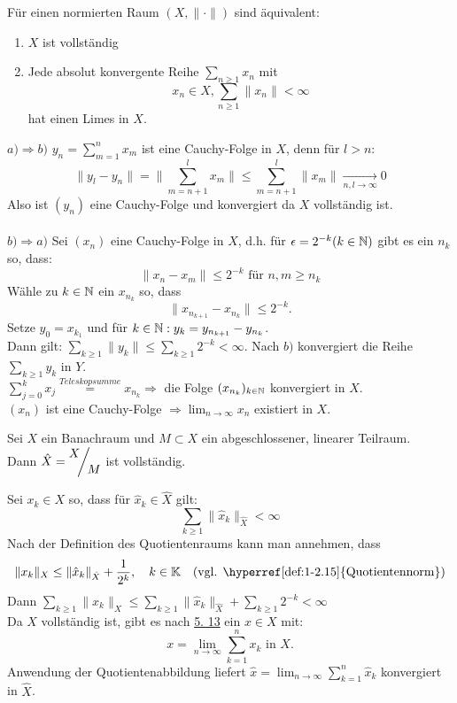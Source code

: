 \begin{lemma} \label{lemma:5.13}
	Für einen normierten Raum $(X, \| \cdot \|)$ sind äquivalent:
	\begin{enumerate}[label=\alph*\upshape)]
		\item $X$ ist vollständig
		\item Jede absolut konvergente Reihe $\sum_{n \geq 1} x_{n}$ mit
			\[ x_{n} \in X, \sum_{n \geq 1} \| x_{n} \| < \infty \]
			hat einen Limes in $X$.
	\end{enumerate}	
\end{lemma}

\begin{beweis}
	$a) \Rightarrow b)$	$y_{n} = \sum_{m = 1}^{n} x_{m}$ ist eine Cauchy-Folge in $X$, denn für $l > n$:
		\[ \| y_{l} - y_{n} \| = \| \sum_{m = n + 1}^{l} x_{m} \| \leq \sum_{m = n + 1}^{l} \| x_{m} \| \xrightarrow[n, l \rightarrow \infty]{} 0 \]
	Also ist $(y_{n})$ eine Cauchy-Folge und konvergiert da $X$ vollständig ist. \\ \\
	$b) \Rightarrow a)$	Sei $(x_{n})$ eine Cauchy-Folge in $X$, d.h. für $\epsilon = 2^{-k} (k \in \mathbb{N})$ gibt es ein $n_{k}$ so, dass:
		\[ \| x_{n} - x_{m} \| \leq 2^{-k} \text{ für } n, m \geq n_{k} \]
		Wähle zu $k \in \mathbb{N}$ ein $x_{n_{k}}$ so, dass
		\[ \| x_{n_{k+1}} - x_{n_{k}} \| \leq 2^{-k}.\]
		Setze $y_{0} = x_{k_{1}}$ und für $k \in \mathbb{N}: y_{k} = y_{n_{k+1}} - y_{n_{k}}$. \\
		Dann gilt: $\sum_{k \geq 1} \| y_{k} \| \leq \sum_{k \geq 1} 2^{-k} < \infty$. Nach $b)$ konvergiert die Reihe $\sum_{k \geq 1} y_{k}$ in $Y$. \\
		$\sum_{j = 0}^{k} x_{j} \overset{Teleskopsumme}{=} x_{n_{k}} \Rightarrow $ die Folge $(x_{n_{k}})_{k \in \mathbb{N}}$ konvergiert in $X$. \\
		$(x_{n})$ ist eine Cauchy-Folge $\Rightarrow \lim_{n \rightarrow \infty} x_{n}$ existiert in $X$.
\end{beweis}


\begin{kor}
	Sei $X$ ein Banachraum und $M \subset X$ ein abgeschlossener, linearer Teilraum. \\
	Dann $\hat X = \QR{X}{M}$ ist vollständig.
	\begin{beweis}	
		Sei $x_{k} \in X$ so, dass für $\hat x_{k} \in \hat X$ gilt:
		\[ \sum_{k \geq 1} \| \hat x_{k} \|_{\hat X} < \infty \]
		Nach der Definition des Quotientenraums kann man annehmen, dass
		\[ \| x_{k} \|_{X} \leq \| \hat x_{k} \|_{\hat X} + \frac{1}{2^{k}}, \quad k \in \MdK \quad \text{(vgl. \hyperref[def:1-2.15]{Quotientennorm})} \]
		Dann $\sum_{k \geq 1} \| x_{k} \|_{X} \leq \sum_{k \geq 1} \| \hat x_{k} \|_{\hat X} + \sum_{k \geq 1} 2^{-k} < \infty$ \\
		Da $X$ vollständig ist, gibt es nach \hyperref[lemma:1-5.13]{5. 13} ein $x \in X$ mit:
			\[ x = \lim_{n \rightarrow \infty} \sum_{k = 1}^{n} x_{k} \text{ in } X. \]
		Anwendung der Quotientenabbildung liefert $\hat x = \lim_{n \rightarrow \infty} \sum_{k = 1}^{n} \hat x_{k}$ konvergiert in $\hat X$.
	\end{beweis}
\end{kor}


